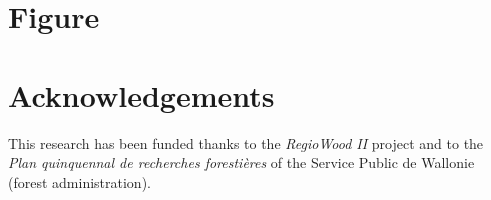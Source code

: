 \documentclass[3p,procedia]{elsarticle}
\begin{document}
\section{Figure}


	


\section{Acknowledgements}

This research has been funded thanks to the \textit{RegioWood II} project and to the \textit{Plan quinquennal de recherches forestières} of the Service Public de Wallonie (forest administration).

%

\end{document}
